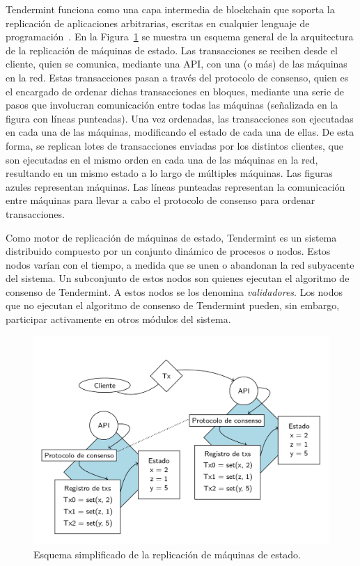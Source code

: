 Tendermint funciona como una capa intermedia de blockchain que soporta la replicación de aplicaciones arbitrarias,
escritas en cualquier lenguaje de programación~\cite{tendermint.design}.
%
En la Figura~\ref{fig:replication} se muestra un esquema general de la arquitectura de la replicación de máquinas de
estado.
%
Las transacciones se reciben desde el cliente, quien se comunica, mediante una API, con una (o más) de las máquinas
en la red.
%
Estas transacciones pasan a través del protocolo de consenso, quien es el encargado de ordenar dichas
transacciones en bloques, mediante una serie de pasos que involucran comunicación entre todas las máquinas
(señalizada en la figura con líneas punteadas).
%
Una vez ordenadas, las transacciones son ejecutadas en cada una de las máquinas, modificando el estado
de cada una de ellas.
%
De esta forma, se replican lotes de transacciones enviadas por los distintos clientes, que son ejecutadas en el mismo
orden en cada una de las máquinas en la red, resultando en un mismo estado a lo largo de múltiples máquinas.
%
Las figuras azules representan máquinas.
%
Las líneas punteadas representan la comunicación entre máquinas para llevar a cabo el protocolo de consenso para ordenar
transacciones.

Como motor de replicación de máquinas de estado, Tendermint es un sistema distribuido compuesto por un conjunto
dinámico de procesos o nodos.
%
Estos nodos varían con el tiempo, a medida que se unen o abandonan la red subyacente del sistema.
%
Un subconjunto de estos nodos son quienes ejecutan el algoritmo de consenso de Tendermint.
%
A estos nodos se los denomina \textit{validadores}.
%
Los nodos que no ejecutan el algoritmo de consenso de Tendermint pueden, sin embargo, participar
activamente en otros módulos del sistema.


\begin{figure}
  \centering
  \includegraphics[scale=0.3]{figures/state-machine-replication.png}
  \caption{Esquema simplificado de la replicación de máquinas de estado.}
  \label{fig:replication}
\end{figure}

